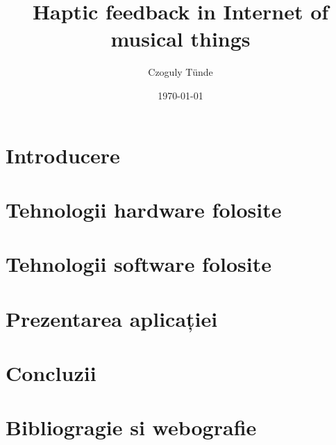 \documentclass[a4paper, 12pt, titlepage]{article}
\title{Haptic feedback in Internet of musical things}
\author{Czoguly Tünde}
\date{\today}
\begin{document}
\maketitle
\tableofcontents

\newpage

\listoffigures

\newpage

\section{Introducere}


\newpage

\section{Tehnologii hardware folosite}


\newpage

\section{Tehnologii software folosite}


\newpage

\section{Prezentarea aplicației}


\newpage

\section{Concluzii}

\newpage

\section{Bibliogragie si webografie}


\end{document}

